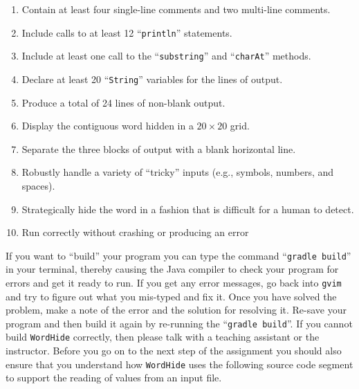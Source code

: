 \documentclass[11pt]{article}
\newcommand{\mainprogram}{\lstinline{WordHide}}
\newcommand{\gradlebuild}{\command{gradle build}}
\newcommand{\command}[1]{``\lstinline{#1}''}
\newcommand{\program}[1]{\lstinline{#1}}
\newcommand{\option}[1]{``{#1}''}
\newcommand{\step}[1]{``{#1}''}
\begin{document}
\vspace*{-.1in}
\begin{enumerate}
  \setlength{\itemsep}{0pt}

\item Contain at least four single-line comments and two multi-line comments.
\item Include calls to at least 12 \command{println} statements.
\item Include at least one call to the \command{substring} and \command{charAt} methods.
\item Declare at least 20 \command{String} variables for the lines of output.
\item Produce a total of 24 lines of non-blank output.
\item Display the contiguous word hidden in a $20 \times 20$ grid.
\item Separate the three blocks of output with a blank horizontal line.
\item Robustly handle a variety of ``tricky'' inputs (e.g., symbols, numbers,
  and spaces).
\item Strategically hide the word in a fashion that is difficult for a human
  to detect.
\item Run correctly without crashing or producing an error

\end{enumerate}
\vspace*{-.1in}


If you want to \step{build} your program you can type the command \gradlebuild{}
in your terminal, thereby causing the Java compiler to check your program for
errors and get it ready to run. If you get any error messages, go back into
\program{gvim} and try to figure out what you mis-typed and fix it. Once you
have solved the problem, make a note of the error and the solution for resolving
it. Re-save your program and then build it again by re-running the
\gradlebuild{}. If you cannot build \mainprogram{} correctly, then please talk
with a teaching assistant or the instructor. Before you go on to the next step
of the assignment you should also ensure that you understand how \mainprogram{}
uses the following source code segment to support the reading of values from an
input file.
\end{document}

